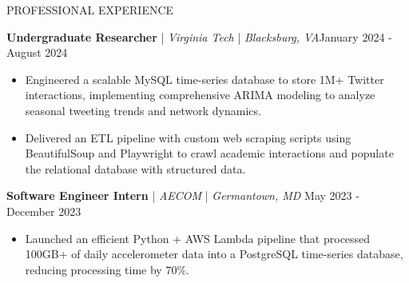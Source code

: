 \begin{rSection}{PROFESSIONAL EXPERIENCE}
    \vspace{-0.15em}
    
    \textbf{Undergraduate Researcher} | \textit{Virginia Tech} | \textit{Blacksburg, VA}\hfill January 2024 - August 2024\\
    \begin{itemize}[leftmargin=12pt]
        \itemsep -4pt {} \vspace{-1.75em}
        \item Engineered a scalable MySQL time-series database to store 1M+ Twitter interactions, implementing comprehensive ARIMA modeling to analyze seasonal tweeting trends and network dynamics.
        \item Delivered an ETL pipeline with custom web scraping scripts using BeautifulSoup and Playwright to crawl academic interactions and populate the relational database with structured data.
    \end{itemize}
    
    \vspace{-0.15em}

    \textbf{Software Engineer Intern} | \textit{AECOM} | \textit{Germantown, MD} \hfill May 2023 - December 2023\\
    \begin{itemize}[leftmargin=12pt]
        \itemsep -4pt {} \vspace{-1.75em}
        \item Launched an efficient Python + AWS Lambda pipeline that processed 100GB+ of daily accelerometer data into a PostgreSQL time-series database, reducing processing time by 70\%.
    \end{itemize}

\end{rSection}
